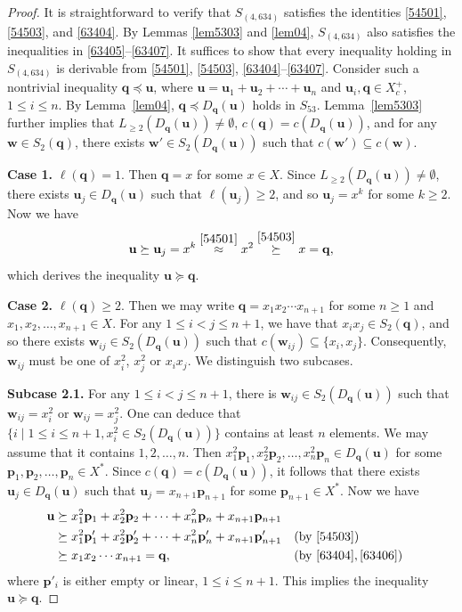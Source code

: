 \documentclass[reqno]{amsart}
\theoremstyle{plain}
\theoremstyle{definition}
\newcommand{\bp}{\mathbf{p}}
\newcommand{\bq}{\mathbf{q}}
\newcommand{\bu}{\mathbf{u}}
\newcommand{\bw}{\mathbf{w}}
\begin{document}
\begin{proof}
It is straightforward to verify that $S_{(4, 634)}$ satisfies the identities \eqref{54501}, \eqref{54503}, and \eqref{63404}.
By Lemmas \ref{lem5303} and \ref{lem04}, $S_{(4, 634)}$ also satisfies the inequalities in \eqref{63405}--\eqref{63407}.
It suffices to show that every inequality holding in $S_{(4, 634)}$
is derivable from \eqref{54501}, \eqref{54503}, \eqref{63404}--\eqref{63407}.
Consider such a nontrivial inequality $\bq\preceq \bu$, where
$\bu=\bu_1+\bu_2+\cdots+\bu_n$ and $\bu_i, \bq \in X_c^+$, $1 \leq i \leq n$.
By Lemma~\ref{lem04}, $\bq\preceq D_\bq(\bu)$ holds in $S_{53}$.
Lemma~\ref{lem5303} further implies that
$L_{\geq 2}(D_\bq(\bu))\neq \emptyset$, $c(\bq)=c(D_\bq(\bu))$,
and for any $\bw\in S_2(\bq)$, there exists $\bw'\in S_2(D_\bq(\bu))$ such that $c(\bw')\subseteq c(\bw)$.

\textbf{Case 1.} $\ell(\bq)=1$. Then $\bq=x$ for some $x\in X$. Since $L_{\geq 2}(D_\bq(\bu))\neq \emptyset$,
there exists $\bu_j\in D_\bq(\bu)$ such that $\ell(\bu_j)\geq2$, and so $\bu_j=x^k$ for some $k\geq2$.
Now we have
\[
\bu \succeq\bu_j=x^k\stackrel{\eqref{54501}}\approx x^2\stackrel{\eqref{54503}}\succeq x=\bq,
\]
which derives the inequality $\bu \succeq \bq$.

\textbf{Case 2.} $\ell(\bq)\geq2$.
Then we may write $\bq=x_1x_2\cdots x_{n+1}$ for some $n\geq 1$ and $x_1, x_2, \ldots, x_{n+1} \in X$.
For any $1\leq i<j\leq n+1$, we have that $x_ix_j\in S_2(\bq)$,
and so there exists $\bw_{ij}\in S_2(D_\bq(\bu))$ such that $c(\bw_{ij})\subseteq \{x_i, x_j\}$.
Consequently, $\bw_{ij}$ must be one of $x_i^2$, $x_j^2$ or $x_ix_j$. We distinguish two subcases.

\textbf{Subcase 2.1.} For any $1\leq i<j\leq n+1$,
there is $\bw_{ij}\in S_2(D_\bq(\bu))$ such that $\bw_{ij}=x_i^2$ or $\bw_{ij}=x_j^2$.
One can deduce that $\{i\mid 1\leq i\leq n+1, x_i^2\in S_2(D_\bq(\bu))\}$
contains at least $n$ elements.
We may assume that it contains $1, 2, \ldots, n$.
Then $x_1^2\bp_1, x_2^2\bp_2, \dots, x_{n}^2\bp_{n}\in D_\bq(\bu)$ for some $\bp_1, \bp_2, \ldots, \bp_n \in X^*$.
Since $c(\bq)=c(D_\bq(\bu))$,
it follows that there exists $\bu_j\in D_\bq(\bu)$ such that $\bu_j=x_{n+1}\bp_{n+1}$ for some $\bp_{n+1}\in X^*$.
Now we have
\begin{align*}
\bu
&\succeq x_1^2\bp_1+x_2^2\bp_2+\dots+x_{n}^2\bp_{n}+x_{n+1}\bp_{n+1}\\
&\succeq x_1^2\bp'_1+x_2^2\bp'_2+\dots+x_{n}^2\bp'_{n}+x_{n+1}\bp'_{n+1}&&(\text{by}~\eqref{54503})\\
&\succeq x_1x_2\cdots x_{n+1}=\bq, &&(\text{by}~\eqref{63404},\eqref{63406})
\end{align*}
where $\bp'_i$ is either empty or linear, $1\leq i \leq n+1$.
This implies the inequality $\bu \succeq \bq$.


\end{proof}
\end{document}
